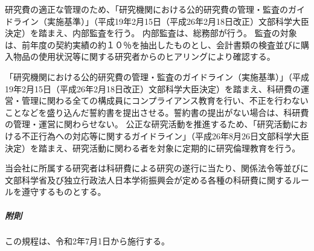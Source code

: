 \documentclass[10pt,a4paper]{jsarticle}
\begin{document}
研究費の適正な管理のため、「研究機関における公的研究費の管理・監査のガイドライン（実施基準）」（平成19年2月15日（平成26年2月18日改正）文部科学大臣決定）を踏まえ、内部監査を行う。
\term 内部監査は、総務部が行う。
\term 監査の対象は、前年度の契約実績の約１０％を抽出したものとし、会計書類の検査並びに購入物品の使用状況等に関する研究者からのヒアリングにより確認する。

「研究機関における公的研究費の管理・監査のガイドライン（実施基準）」（平成19年2月15日（平成26年2月18日改正）文部科学大臣決定）を踏まえ、科研費の運営・管理に関わる全ての構成員にコンプライアンス教育を行い、不正を行わないことなどを盛り込んだ誓約書を提出させる。誓約書の提出がない場合は、科研費の管理・運営に関わらせない。
\term 公正な研究活動を推進するため、「研究活動における不正行為への対応等に関するガイドライン」（平成26年8月26日文部科学大臣決定）を踏まえ、研究活動に関わる者を対象に定期的に研究倫理教育を行う。

当会社に所属する研究者は科研費による研究の遂行に当たり、関係法令等並びに文部科学省及び独立行政法人日本学術振興会が定める各種の科研費に関するルールを遵守するものとする。
\\

\subparagraph{附則}
この規程は、令和2年7月1日から施行する。
\end{document}
